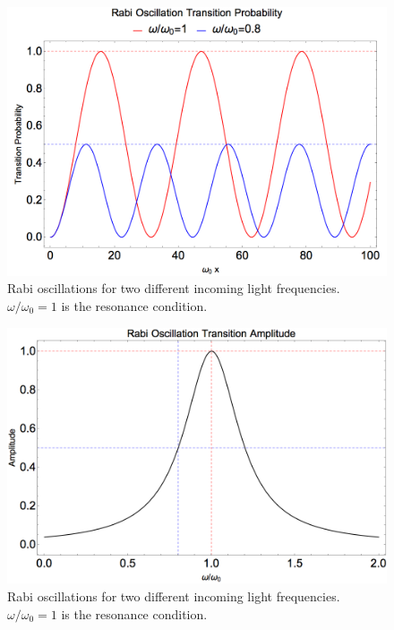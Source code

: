 \begin{figure}
    \centering
    \includegraphics[width=\textwidth]{chapters/assets/app/rabi-oscillations.png}
    \caption{Rabi oscillations for two different incoming light frequencies. $\omega/\omega_0=1$ is the resonance condition.}
    \label{app-fig:rabi-examples}
\end{figure}



\begin{figure}
    \centering
    \includegraphics[width=\textwidth]{chapters/assets/app/rabi-resonance.png}
    \caption{Rabi oscillations for two different incoming light frequencies. $\omega/\omega_0=1$ is the resonance condition.}
    \label{app-fig:rabi-resonance-width}
\end{figure}




